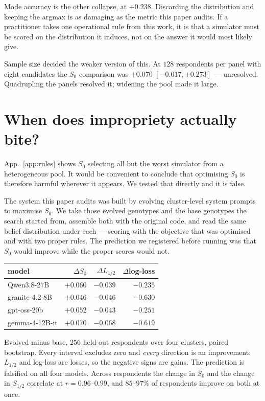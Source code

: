 \documentclass[11pt]{article}
\begin{document}
Mode accuracy is the other collapse, at $+0.238$. Discarding the distribution
and keeping the argmax is as damaging as the metric this paper audits. If a
practitioner takes one operational rule from this work, it is that a simulator
must be scored on the distribution it induces, not on the answer it would most
likely give.

Sample size decided the weaker version of this. At $128$ respondents per panel
with eight candidates the $S_0$ comparison was $+0.070$ $[-0.017,+0.273]$ ---
unresolved. Quadrupling the panels resolved it; widening the pool made it
large.

\section{When does impropriety actually bite?}
\label{app:whenbites}

App.~\ref{app:rules} shows $S_0$ selecting all but the worst simulator from a
heterogeneous pool. It would be convenient to conclude that optimising $S_0$ is
therefore harmful wherever it appears. We tested that directly and it is false.

The system this paper audits was built by evolving cluster-level system prompts
to maximise $S_0$. We take those evolved genotypes and the base genotypes the
search started from, assemble both with the original code, and read the same
belief distribution under each --- scoring with the objective that was
optimised and with two proper rules. The prediction we registered before
running was that $S_0$ would improve while the proper scores would not.

\begin{center}\small
\setlength{\tabcolsep}{4pt}
\begin{tabular}{@{}lr@{\,}r@{\,}r@{}}
\toprule
model & $\Delta S_0$ & $\Delta L_{1/2}$ & $\Delta$log-loss\\
\midrule
Qwen3.8-27B      & $+0.060$ & $-0.039$ & $-0.235$\\
granite-4.2-8B   & $+0.046$ & $-0.046$ & $-0.630$\\
gpt-oss-20b      & $+0.052$ & $-0.043$ & $-0.251$\\
gemma-4-12B-it   & $+0.070$ & $-0.068$ & $-0.619$\\
\bottomrule
\end{tabular}
\end{center}

Evolved minus base, $256$ held-out respondents over four clusters, paired
bootstrap. Every interval excludes zero and \emph{every} direction is an
improvement: $L_{1/2}$ and log-loss are losses, so the negative signs are
gains. The prediction is falsified on all four models. Across respondents the
change in $S_0$ and the change in $S_{1/2}$ correlate at $r=0.96$--$0.99$, and
$85$--$97\%$ of respondents improve on both at once.
\end{document}
